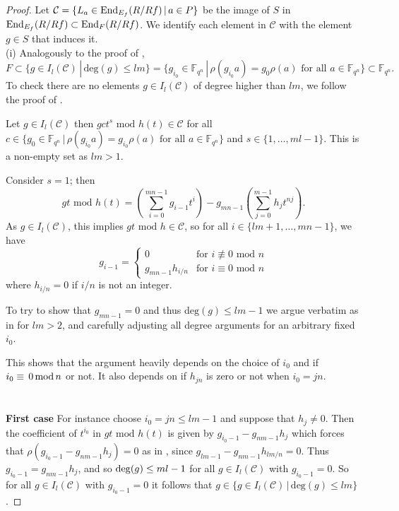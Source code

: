 \documentclass[12pt]{amsart}
\theoremstyle{plain}
\theoremstyle{definition}
\numberwithin{equation}{section}
\numberwithin{figure}{section}
\begin{document}
\begin{proof}
Let $\mathcal{C}=\{L_a\in {\rm End}_{E_f}(R/Rf)\,|\, a\in P\}$ be the image of $S$ in ${\rm End}_{E_f}(R/Rf)\subset {\rm End}_{F}(R/Rf)$. We identify each element in $\mathcal{C}$ with the element $g\in S$ that induces it.
 \\ (i)
Analogously to the proof of \cite[Theorem 9]{Sheekey},
$$F\subset \lbrace g\in I_l(\mathcal{C}) \,|\, \text{deg}(g)\leq lm\rbrace= \lbrace g_{i_0}\in \mathbb{F}_{q^n} \,|\, \rho(g_{i_0} a) = g_0\rho(a)  \text{ for all } a\in \mathbb{F}_{q^n}\rbrace\subset \mathbb{F}_{q^n}.$$
 To check there are no elements $g\in I_l(\mathcal{C})$ of degree higher than $lm$, we follow the proof of \cite[Theorem 9]{Sheekey}.
 
 Let $g\in I_l(\mathcal{C})$ then $gct^s  \text{ mod } h(t) %
 \in \mathcal{C}$ for all $c\in \lbrace g_0\in \mathbb{F}_{q^n} \,|\, \rho(g_{i_0} a) = g_{i_0}\rho(a)  \text{ for all } a\in \mathbb{F}_{q^n}\rbrace$ and $s\in \{1,\dots , {ml-1}\}$. This is a non-empty set as $lm>1.$

 Consider $s=1$; then 
 $$gt \text{ mod } h(t)=\left(\sum_{i=0}^{mn-1}g_{i-1}t^i\right)-g_{mn-1}\left(\sum_{j=0}^{m-1}h_jt^{nj}\right).$$
As $g\in I_l(\mathcal{C})$, this implies $gt \text{ mod } h\in \mathcal{C}$, so for all $i\in\lbrace lm+1,\dots, mn-1\rbrace$, we have
\begin{equation}\label{eqn:nucleus g_i}
g_{i-1}=\begin{cases}
0& \text{for } i\not\equiv 0\text{ mod }n\\
g_{mn-1}h_{i/n}& \text{for } i\equiv 0\text{ mod }n
\end{cases}
\end{equation}
where $h_{i/n}=0$ if $i/n$ is not an integer.

To try to show that $g_{mn-1}=0$ and thus $\text{deg}(g)\leq lm-1$ we argue verbatim as in  \cite[Theorem 9]{Sheekey} for $lm>2$, and carefully adjusting all degree arguments for an arbitrary fixed $i_0$.

This shows that the argument heavily depends on the choice of $i_0$ and if $i_0 \equiv \,0\, {\rm mod}\, n$ or not. It also depends on if $h_{jn}$ is zero or not when $i_0=jn$.
\\\\
\\ {\bf First case}
For instance choose $i_0=jn\leq lm-1$ and suppose that $h_j\not=0$. Then the coefficient of $t^{i_0}$ in $gt \text{ mod } h(t)$
is given by
$g_{i_0-1}-g_{nm-1}h_j$ which forces that $\rho(g_{i_0-1}-g_{nm-1}h_j)=0$ as in \cite{Sheekey}, since $g_{lm-1}-g_{nm-1}h_{lm/n}=0 $. Thus $g_{i_0-1}=g_{nm-1}h_j$,
and so ${\rm deg}(g)\leq ml-1$ for all $g\in  I_l(\mathcal{C})$ with $g_{i_0-1}=0$. So for all
$g \in  I_l(\mathcal{C})$ with $g_{i_0-1}=0$ it follows that $g\in \{ g\in I_l(\mathcal{C}) \,|\, \text{deg}(g)\leq lm\rbrace$.


\end{proof}
\end{document}
